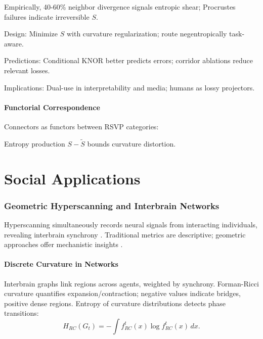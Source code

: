 \documentclass{article}
\theoremstyle{definition}
\begin{document}
Empirically, 40-60\% neighbor divergence signals entropic shear; Procrustes failures indicate irreversible $S$.

Design: Minimize $S$ with curvature regularization; route negentropically task-aware.

Predictions: Conditional KNOR better predicts errors; corridor ablations reduce relevant losses.

Implications: Dual-use in interpretability and media; humans as lossy projectors.

\subsection{Functorial Correspondence}

Connectors as functors between RSVP categories:


Entropy production $S - \tilde{S}$ bounds curvature distortion.

\part{Social Applications}

\section{Geometric Hyperscanning and Interbrain Networks}

Hyperscanning simultaneously records neural signals from interacting individuals, revealing interbrain synchrony \cite{montague2002hyperscanning}. Traditional metrics are descriptive; geometric approaches offer mechanistic insights \cite{hinrichs2025geometry}.

\subsection{Discrete Curvature in Networks}

Interbrain graphs link regions across agents, weighted by synchrony. Forman-Ricci curvature quantifies expansion/contraction; negative values indicate bridges, positive dense regions. Entropy of curvature distributions detects phase transitions:
\[
H_{RC}(G_t) = -\int f^t_{RC}(x) \log f^t_{RC}(x) \, dx.
\]
\end{document}
